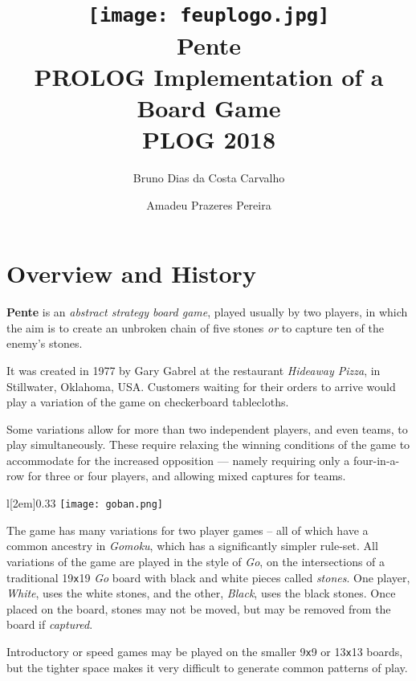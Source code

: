 \documentclass[12pt,a4paper,notitlepage]{article}
\title{
	\vspace{-2\baselineskip}
	\texttt{[image: feuplogo.jpg]}\\
	{\Huge Pente}\\
	{\Large PROLOG Implementation of a Board Game}\\
	{\normalsize PLOG 2018}
}
\author{
	Bruno Dias da Costa Carvalho\hspace*{1.5em}\text{up201606517}
	\and
	Amadeu Prazeres Pereira\hspace*{1.5em}\text{up201605646} 
}
\newcommand*{\boardsize}[1]{#1\texttt{x}#1}
\begin{document}
\maketitle
\thispagestyle{empty}
\tableofcontents

\section{Overview and History}
\label{sec:overview}

\textbf{Pente} is an \textit{abstract strategy board game}, played usually by two players, in which the aim is to create an unbroken chain of five stones \emph{or} to capture ten of the enemy's stones.

It was created in 1977 by Gary Gabrel at the restaurant \textsl{Hideaway Pizza}, in Stillwater, Oklahoma, USA.\supercite{pente-wikipedia}
Customers waiting for their orders to arrive would play a variation of the game on checkerboard tablecloths.\supercite{pente-wikipedia}

Some variations allow for more than two independent players, and even teams, to play simultaneously. These require relaxing the winning conditions of the game to accommodate for the increased opposition --- namely requiring only a four-in-a-row for three or four players, and allowing mixed captures for teams.\supercite{pente-winning-moves}

\begin{wrapfigure}[12]{l}[2em]{0.33\textwidth}
	\vspace*{-1\baselineskip}
	\texttt{[image: goban.png]}
	\caption{\boardsize{19} \textit{Go} board. \label{fig:goban}}
\end{wrapfigure}

The game has many variations for two player games -- all of which have a common ancestry in \textit{Gomoku}, which has a significantly simpler rule-set.
All variations of the game are played in the style of \textit{Go}, on the intersections of a traditional \boardsize{19} \emph{Go} board with black and white pieces called \emph{stones}. One player, \textsl{White}, uses the white stones, and the other, \textsl{Black}, uses the black stones. Once placed on the board, stones may not be moved, but may be removed from the board if \emph{captured}.

Introductory or speed games may be played on the smaller \boardsize{9} or \boardsize{13} boards, but the tighter space makes it very difficult to generate common patterns of play.
\end{document}
